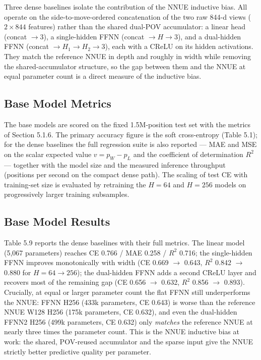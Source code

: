 Three dense baselines isolate the contribution of the NNUE inductive bias. All operate on the side-to-move-ordered concatenation of the two raw 844-d views ($2\times844$ features) rather than the shared dual-POV accumulator: a linear head (concat $\to 3$), a single-hidden FFNN (concat $\to H \to 3$), and a dual-hidden FFNN (concat $\to H_1 \to H_2 \to 3$), each with a CReLU on its hidden activations. They match the reference NNUE in depth and roughly in width while removing the shared-accumulator structure, so the gap between them and the NNUE at equal parameter count is a direct measure of the inductive bias.

\subsection{Base Model Metrics}

The base models are scored on the fixed 1.5M-position test set with the metrics of Section 5.1.6. The primary accuracy figure is the soft cross-entropy (Table 5.1); for the dense baselines the full regression suite is also reported --- MAE and MSE on the scalar expected value $v = p_W - p_L$ and the coefficient of determination $R^2$ --- together with the model size and the measured inference throughput (positions per second on the compact dense path). The scaling of test CE with training-set size is evaluated by retraining the $H=64$ and $H=256$ models on progressively larger training subsamples.

\subsection{Base Model Results}

Table 5.9 reports the dense baselines with their full metrics. The linear model (5,067 parameters) reaches CE 0.766 / MAE 0.258 / $R^2$ 0.716; the single-hidden FFNN improves monotonically with width (CE 0.669 $\to$ 0.643, $R^2$ 0.842 $\to$ 0.880 for $H=64\to256$); the dual-hidden FFNN adds a second CReLU layer and recovers most of the remaining gap (CE 0.656 $\to$ 0.632, $R^2$ 0.856 $\to$ 0.893). Crucially, at equal or larger parameter count the flat FFNN still underperforms the NNUE: FFNN H256 (433k parameters, CE 0.643) is worse than the reference NNUE W128 H256 (175k parameters, CE 0.632), and even the dual-hidden FFNN2 H256 (499k parameters, CE 0.632) only \emph{matches} the reference NNUE at nearly three times the parameter count. This is the NNUE inductive bias at work: the shared, POV-reused accumulator and the sparse input give the NNUE strictly better predictive quality per parameter.

